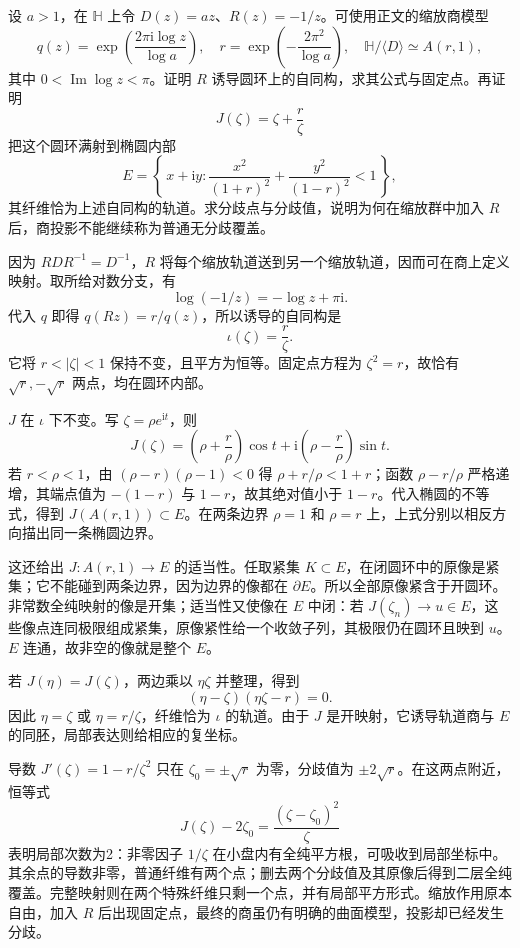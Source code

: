 \begin{exercise}\label{b3:ex:11-8}
设 \(a>1\)，在 \(\mathbb H\) 上令 \(D(z)=az\)、\(R(z)=-1/z\)。可使用正文的缩放商模型
\[
 q(z)=\exp\left(\frac{2\pi\mathrm i\log z}{\log a}\right),\quad
 r=\exp\left(-\frac{2\pi^2}{\log a}\right),\quad
 \mathbb H/\langle D\rangle\simeq A(r,1),
\]
其中 \(0<\operatorname{Im}\log z<\pi\)。证明 \(R\) 诱导圆环上的自同构，求其公式与固定点。再证明
\[
 J(\zeta)=\zeta+\frac r\zeta
\]
把这个圆环满射到椭圆内部
\[
 E=\left\{\,x+\mathrm i y:
       \frac{x^2}{(1+r)^2}+\frac{y^2}{(1-r)^2}<1\,\right\},
\]
其纤维恰为上述自同构的轨道。求分歧点与分歧值，说明为何在缩放群中加入 \(R\) 后，商投影不能继续称为普通无分歧覆盖。
\end{exercise}
\begin{solution}
因为 \(RDR^{-1}=D^{-1}\)，\(R\) 将每个缩放轨道送到另一个缩放轨道，因而可在商上定义映射。取所给对数分支，有
\[
 \log(-1/z)=-\log z+\pi\mathrm i.
\]
代入 \(q\) 即得 \(q(Rz)=r/q(z)\)，所以诱导的自同构是
\[
 \iota(\zeta)=\frac r\zeta.
\]
它将 \(r<|\zeta|<1\) 保持不变，且平方为恒等。固定点方程为 \(\zeta^2=r\)，故恰有 \(\sqrt r,-\sqrt r\) 两点，均在圆环内部。

\(J\) 在 \(\iota\) 下不变。写 \(\zeta=\rho e^{\mathrm i t}\)，则
\[
 J(\zeta)=\left(\rho+\frac r\rho\right)\cos t
       +\mathrm i\left(\rho-\frac r\rho\right)\sin t.
\]
若 \(r<\rho<1\)，由 \((\rho-r)(\rho-1)<0\) 得 \(\rho+r/\rho<1+r\)；函数 \(\rho-r/\rho\) 严格递增，其端点值为 \(-(1-r)\) 与 \(1-r\)，故其绝对值小于 \(1-r\)。代入椭圆的不等式，得到 \(J(A(r,1))\subset E\)。在两条边界 \(\rho=1\) 和 \(\rho=r\) 上，上式分别以相反方向描出同一条椭圆边界。

这还给出 \(J:A(r,1)\to E\) 的适当性。任取紧集 \(K\subset E\)，在闭圆环中的原像是紧集；它不能碰到两条边界，因为边界的像都在 \(\partial E\)。所以全部原像紧含于开圆环。非常数全纯映射的像是开集；适当性又使像在 \(E\) 中闭：若 \(J(\zeta_n)\to u\in E\)，这些像点连同极限组成紧集，原像紧性给一个收敛子列，其极限仍在圆环且映到 \(u\)。\(E\) 连通，故非空的像就是整个 \(E\)。

若 \(J(\eta)=J(\zeta)\)，两边乘以 \(\eta\zeta\) 并整理，得到
\[
 (\eta-\zeta)(\eta\zeta-r)=0.
\]
因此 \(\eta=\zeta\) 或 \(\eta=r/\zeta\)，纤维恰为 \(\iota\) 的轨道。由于 \(J\) 是开映射，它诱导轨道商与 \(E\) 的同胚，局部表达则给相应的复坐标。

导数 \(J'(\zeta)=1-r/\zeta^2\) 只在 \(\zeta_0=\pm\sqrt r\) 为零，分歧值为 \(\pm2\sqrt r\)。在这两点附近，恒等式
\[
 J(\zeta)-2\zeta_0=\frac{(\zeta-\zeta_0)^2}{\zeta}
\]
表明局部次数为2：非零因子 \(1/\zeta\) 在小盘内有全纯平方根，可吸收到局部坐标中。其余点的导数非零，普通纤维有两个点；删去两个分歧值及其原像后得到二层全纯覆盖。完整映射则在两个特殊纤维只剩一个点，并有局部平方形式。缩放作用原本自由，加入 \(R\) 后出现固定点，最终的商虽仍有明确的曲面模型，投影却已经发生分歧。
\end{solution}
